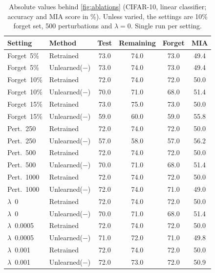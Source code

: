 \begin{table}[t]
  \centering
  \small
  \setlength{\tabcolsep}{3.5pt}
  \begin{tabular}{@{}llcccc@{}}
    \toprule
    Setting & Method & Test & Remaining & Forget & MIA \\
    \midrule
    Forget~5\% & Retrained & 73.0 & 74.0 & 73.0 & 49.4 \\
    Forget~5\% & Unlearned($-$) & 73.0 & 74.0 & 73.0 & 49.4 \\
    Forget~10\% & Retrained & 72.0 & 74.0 & 72.0 & 50.0 \\
    Forget~10\% & Unlearned($-$) & 70.0 & 71.0 & 68.0 & 51.4 \\
    Forget~15\% & Retrained & 73.0 & 75.0 & 73.0 & 50.0 \\
    Forget~15\% & Unlearned($-$) & 59.0 & 60.0 & 59.0 & 55.8 \\
    \midrule
    Pert.~250 & Retrained & 72.0 & 74.0 & 72.0 & 50.0 \\
    Pert.~250 & Unlearned($-$) & 57.0 & 58.0 & 57.0 & 56.2 \\
    Pert.~500 & Retrained & 72.0 & 74.0 & 72.0 & 50.0 \\
    Pert.~500 & Unlearned($-$) & 70.0 & 71.0 & 68.0 & 51.4 \\
    Pert.~1000 & Retrained & 72.0 & 74.0 & 72.0 & 50.0 \\
    Pert.~1000 & Unlearned($-$) & 72.0 & 74.0 & 71.0 & 49.0 \\
    \midrule
    $\lambda$~0 & Retrained & 72.0 & 74.0 & 72.0 & 50.0 \\
    $\lambda$~0 & Unlearned($-$) & 70.0 & 71.0 & 68.0 & 51.4 \\
    $\lambda$~0.0005 & Retrained & 72.0 & 74.0 & 72.0 & 50.0 \\
    $\lambda$~0.0005 & Unlearned($-$) & 71.0 & 72.0 & 71.0 & 49.8 \\
    $\lambda$~0.001 & Retrained & 72.0 & 74.0 & 72.0 & 50.0 \\
    $\lambda$~0.001 & Unlearned($-$) & 72.0 & 73.0 & 72.0 & 50.9 \\
    \bottomrule
  \end{tabular}
  \caption{Absolute values behind \cref{fig:ablations} (CIFAR-10, linear classifier; accuracy and MIA score in \%). Unless varied, the settings are 10\% forget set, 500 perturbations and $\lambda=0$. Single run per setting.}
  \label{tab:ablations}
\end{table}
